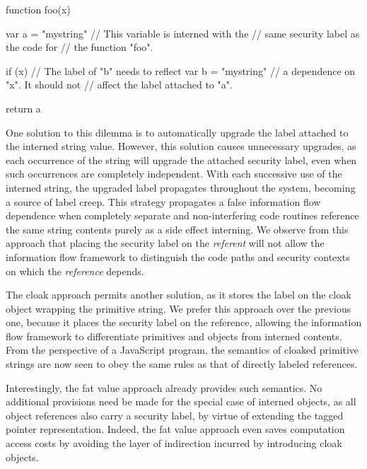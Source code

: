 \begin{jscode}
function foo(x) {
  var a = "mystring"    // This variable is interned with the
                        // same security label as the code for
                        // the function "foo".

  if (x) {              // The label of "b" needs to reflect
    var b = "mystring"  // a dependence on "x". It should not
  }                     // affect the label attached to "a".

  return a
}
\end{jscode}

One solution to this dilemma is to automatically upgrade the label attached to the interned string value.
However, this solution causes unnecessary upgrades, as each occurrence of the string will upgrade the attached security label, even when such occurrences are completely independent.
With each successive use of the interned string, the upgraded label propagates throughout the system, becoming a source of label creep.
This strategy propagates a false information flow dependence when completely separate and non-interfering code routines reference the same string contents purely as a side effect interning.
We observe from this approach that placing the security label on the \emph{referent} will not allow the information flow framework to distinguish the code paths and security contexts on which the \emph{reference} depends.

The cloak approach permits another solution, as it stores the label on the cloak object wrapping the primitive string.
We prefer this approach over the previous one, because it places the security label on the reference, allowing the information flow framework to differentiate primitives and objects from interned contents.
From the perspective of a JavaScript program, the semantics of cloaked primitive strings are now seen to obey the same rules as that of directly labeled references.

Interestingly, the fat value approach already provides such semantics.
No additional provisions need be made for the special case of interned objects, as all object references also carry a security label, by virtue of extending the tagged pointer representation.
Indeed, the fat value approach even saves computation access costs by avoiding the layer of indirection incurred by introducing cloak objects.

